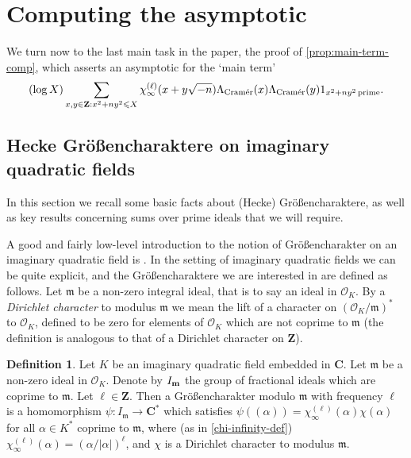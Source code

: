 \documentclass[11pt,reqno]{amsart}
\numberwithin{equation}{section}
\theoremstyle{definition}
\newtheorem{definition}[theorem]{Definition}
\theoremstyle{remark}
\newcommand{\mf}{\mathfrak}
\renewcommand{\le}{\leqslant}
\newcommand\Z{\mathbf{Z}}
\newcommand\C{\mathbf{C}}
\newcommand\cramer{{\textnormal{Cram\'er}}}
\renewcommand\O{\mathcal{O}}
\begin{document}
\section{Computing the asymptotic}\label{section8}
We turn now to the last main task in the paper, the proof of \cref{prop:main-term-comp}, which asserts an asymptotic for the `main term'
\begin{equation}\label{main-term-repeat}(\log X) \sum_{x,y \in \Z: x^2 + ny^2\le X}
\chi_{\infty}^{(\ell)} (x + y \sqrt{-n})\Lambda_{\cramer}(x)\Lambda_{\cramer}(y) 1_{x^2 + ny^2 \operatorname{prime}} .\end{equation}


\subsection{Hecke Gr\"o{\ss}encharaktere on imaginary quadratic fields}\label{basic-hecke-sec}

In this section we recall some basic facts about (Hecke) Gr\"o{\ss}encharaktere, as well as key results concerning sums over prime ideals that we will require. 

A good and fairly low-level introduction to the notion of Gr\"o{\ss}encharakter on an imaginary quadratic field is \cite[Section 3.8]{IK-book}. In the setting of imaginary quadratic fields we can be quite explicit, and the Gr\"o{\ss}encharaktere we are interested in are defined as follows. Let $\mf{m}$ be a non-zero integral ideal, that is to say an ideal in $\O_K$. By a \emph{Dirichlet character} to modulus $\mf{m}$ we mean the lift of a character on $(\O_K/\mf{m})^*$ to $\O_K$, defined to be zero for elements of $\O_K$ which are not coprime to $\mf{m}$ (the definition is analogous to that of a Dirichlet character on $\Z$). 

\begin{definition}
Let $K$ be an imaginary quadratic field embedded in $\C$. Let $\mf{m}$ be a non-zero ideal in $\O_K$. Denote by $I_{\bf{m}}$ the group of fractional ideals which are coprime to $\mf{m}$. Let $\ell \in \Z$. Then a Gr\"o{\ss}encharakter modulo $\mf{m}$ with frequency $\ell$ is a homomorphism $\psi : I_{\mf{m}} \rightarrow \C^*$ which satisfies $\psi((\alpha)) = \chi^{(\ell)}_{\infty}(\alpha) \chi(\alpha)$ for all $\alpha \in K^*$ coprime to $\mf{m}$, where (as in \cref{chi-infinity-def}) $\chi_{\infty}^{(\ell)}(\alpha) = (\alpha/|\alpha|)^{\ell}$, and $\chi$ is a Dirichlet character to modulus $\mf{m}$.
\end{definition}
\end{document}
